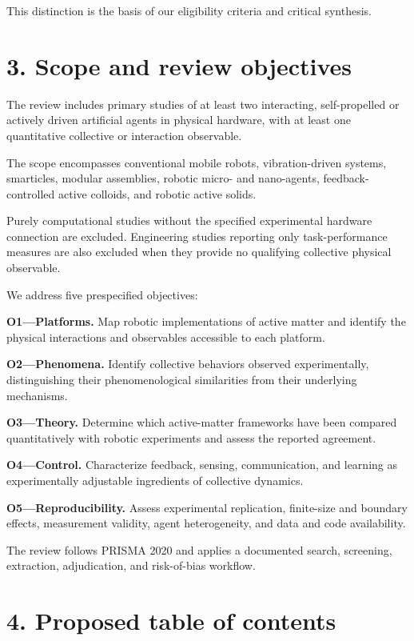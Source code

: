 This distinction is the basis of our
eligibility criteria and critical synthesis.

\section*{3. Scope and review objectives}

The review includes primary studies of at least
two interacting, self-propelled or actively
driven artificial agents in physical hardware,
with at least one quantitative collective
or interaction observable.

The scope encompasses conventional mobile robots,
vibration-driven systems, smarticles, modular
assemblies, robotic micro- and nano-agents,
feedback-controlled active colloids, and
robotic active solids.

Purely computational studies without the
specified experimental hardware connection
are excluded. Engineering studies reporting
only task-performance measures are also
excluded when they provide no qualifying
collective physical observable.

We address five prespecified objectives:

\noindent\textbf{O1---Platforms.}
Map robotic implementations of active matter
and identify the physical interactions and
observables accessible to each platform.

\noindent\textbf{O2---Phenomena.}
Identify collective behaviors observed
experimentally, distinguishing their
phenomenological similarities from
their underlying mechanisms.

\noindent\textbf{O3---Theory.}
Determine which active-matter frameworks
have been compared quantitatively with
robotic experiments and assess
the reported agreement.

\noindent\textbf{O4---Control.}
Characterize feedback, sensing,
communication, and learning as
experimentally adjustable ingredients
of collective dynamics.

\noindent\textbf{O5---Reproducibility.}
Assess experimental replication,
finite-size and boundary effects,
measurement validity,
agent heterogeneity,
and data and code availability.

The review follows PRISMA 2020
\cite{Page2021prisma} and applies
a documented search, screening,
extraction, adjudication, and
risk-of-bias workflow.

\section*{4. Proposed table of contents}

